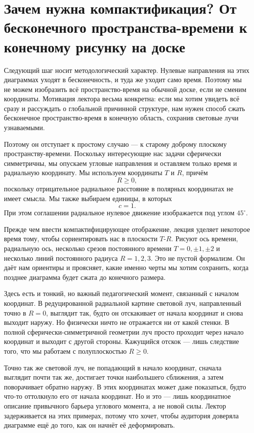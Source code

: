 \section{Зачем нужна компактификация? От бесконечного пространства-времени к конечному рисунку на доске}

Следующий шаг носит методологический характер. Нулевые направления на этих диаграммах уходят в бесконечность, и туда же уходит само время. Поэтому мы не можем изобразить всё пространство-время на обычной доске, если не сменим координаты. Мотивация лектора весьма конкретна: если мы хотим увидеть всё сразу и рассуждать о глобальной причинной структуре, нам нужен способ сжать бесконечное пространство-время в конечную область, сохранив световые лучи узнаваемыми.

Поэтому он отступает к простому случаю — к старому доброму плоскому пространству-времени. Поскольку интересующие нас задачи сферически симметричны, мы опускаем угловые направления и оставляем только время и радиальную координату. Мы используем координаты \(T\) и \(R\), причём
\[
R\ge 0,
\]
поскольку отрицательное радиальное расстояние в полярных координатах не имеет смысла. Мы также выбираем единицы, в которых
\[
c=1.
\]
При этом соглашении радиальное нулевое движение изображается под углом \(45^\circ\).

Прежде чем ввести компактифицирующее отображение, лекция уделяет некоторое время тому, чтобы сориентировать нас в плоскости \(T\)-\(R\). Рисуют ось времени, радиальную ось, несколько срезов постоянного времени \(T=0,\pm1,\pm2\) и несколько линий постоянного радиуса \(R=1,2,3\). Это не пустой формализм. Он даёт нам ориентиры и проясняет, какие именно черты мы хотим сохранить, когда позднее диаграмма будет сжата до конечного размера.

Здесь есть и тонкий, но важный педагогический момент, связанный с началом координат. В редуцированной радиальной картине световой луч, направленный точно в \(R=0\), выглядит так, будто он отскакивает от начала координат и снова выходит наружу. Но физически ничто не отражается ни от какой стенки. В полной сферически-симметричной геометрии луч просто проходит через начало координат и выходит с другой стороны. Кажущийся отскок — лишь следствие того, что мы работаем с полуплоскостью \(R\ge 0\).

Точно так же световой луч, не попадающий в начало координат, сначала выглядит почти так же, достигает точки наибольшего сближения, а затем поворачивает обратно наружу. В этих координатах может даже показаться, будто что-то оттолкнуло его от начала координат. Но и это — лишь координатное описание привычного барьера углового момента, а не новой силы. Лектор задерживается на этих примерах, потому что хочет, чтобы аудитория доверяла диаграмме ещё до того, как он начнёт её деформировать.


